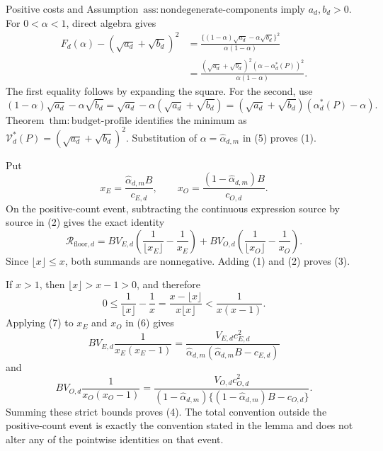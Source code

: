 Positive costs and Assumption~\(\mathrm{ass{:}nondegenerate\text{-}components}\) imply \(a_d,b_d>0\). For \(0<\alpha<1\), direct algebra gives
\[
\begin{aligned}
 F_d(\alpha)-(\sqrt{a_d}+\sqrt{b_d})^2
 &=\frac{\{(1-\alpha)\sqrt{a_d}-\alpha\sqrt{b_d}\}^2}
 {\alpha(1-\alpha)}\\
 &=\frac{(\sqrt{a_d}+\sqrt{b_d})^2
 (\alpha-\alpha_d^*(P))^2}{\alpha(1-\alpha)}.         \tag{5}
\end{aligned}
\]
The first equality follows by expanding the square. For the second, use
\[
 (1-\alpha)\sqrt{a_d}-\alpha\sqrt{b_d}
 =\sqrt{a_d}-\alpha(\sqrt{a_d}+\sqrt{b_d})
 =(\sqrt{a_d}+\sqrt{b_d})(\alpha_d^*(P)-\alpha).
\]
Theorem~\(\mathrm{thm{:}budget\text{-}profile}\) identifies the minimum as \(\mathcal V_d^*(P)=(\sqrt{a_d}+\sqrt{b_d})^2\). Substitution of \(\alpha=\widehat\alpha_{d,m}\) in (5) proves (1).

Put
\[
 x_E=\frac{\widehat\alpha_{d,m}B}{c_{E,d}},
 \qquad
 x_O=\frac{(1-\widehat\alpha_{d,m})B}{c_{O,d}}.
\]
On the positive-count event, subtracting the continuous expression source by source in (2) gives the exact identity
\[
 \mathcal R_{\mathrm{floor},d}
 =BV_{E,d}\left(\frac1{\lfloor x_E\rfloor}-\frac1{x_E}\right)
 +BV_{O,d}\left(\frac1{\lfloor x_O\rfloor}-\frac1{x_O}\right). \tag{6}
\]
Since \(\lfloor x\rfloor\le x\), both summands are nonnegative. Adding (1) and (2) proves (3).

If \(x>1\), then \(\lfloor x\rfloor>x-1>0\), and therefore
\[
 0\le\frac1{\lfloor x\rfloor}-\frac1x
 =\frac{x-\lfloor x\rfloor}{x\lfloor x\rfloor}
 <\frac1{x(x-1)}.                                      \tag{7}
\]
Applying (7) to \(x_E\) and \(x_O\) in (6) gives
\[
 BV_{E,d}\frac1{x_E(x_E-1)}
 =\frac{V_{E,d}c_{E,d}^2}
 {\widehat\alpha_{d,m}(\widehat\alpha_{d,m}B-c_{E,d})}
\]
and
\[
 BV_{O,d}\frac1{x_O(x_O-1)}
 =\frac{V_{O,d}c_{O,d}^2}
 {(1-\widehat\alpha_{d,m})
 \{(1-\widehat\alpha_{d,m})B-c_{O,d}\}}.
\]
Summing these strict bounds proves (4). The total convention outside the positive-count event is exactly the convention stated in the lemma and does not alter any of the pointwise identities on that event.